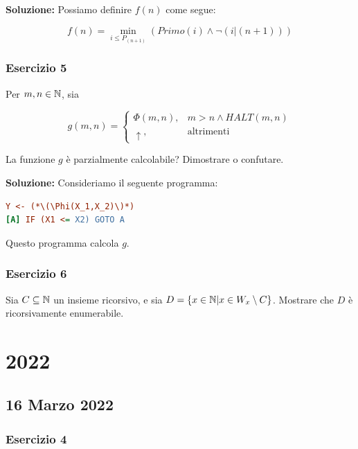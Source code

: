 \textbf{Soluzione: } Possiamo definire \(f(n)\) come segue:

\begin{equation}
  f(n) = \min_{i \leq P_{(n+1)}} (Primo(i) \land \neg (i \vert (n+1)))
\end{equation}

\subsubsection{Esercizio 5}

Per \(m,n \in \mathbb{N}\), sia

\begin{equation}
  g(m,n)=\begin{cases}
    \Phi(m,n), & m>n \land HALT(m,n)\\
    \uparrow, & \text{altrimenti}
  \end{cases}
\end{equation}

La funzione \(g\) è parzialmente calcolabile? Dimostrare o confutare.

\textbf{Soluzione: } Consideriamo il seguente programma:

\begin{lstlisting}[language=ini, caption={ }]
    Y <- (*\(\Phi(X_1,X_2)\)*)
[A] IF (X1 <= X2) GOTO A
\end{lstlisting}

Questo programma calcola \(g\).

\subsubsection{Esercizio 6}

Sia \(C \subseteq \mathbb{N}\) un insieme ricorsivo, e sia \(D=\displaystyle{\left\{{x \in \mathbb{N}\vert x \in W_x \setminus C}\right\}}\). Mostrare che \(D\) è ricorsivamente enumerabile.

\section{2022}

\subsection{16 Marzo 2022}

\subsubsection{Esercizio 4}

